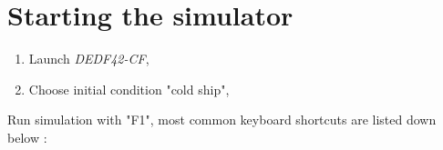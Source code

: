\documentclass[12pt,a4paper]{article}
\begin{document}
%
% 
%    
%
 \section{Starting the simulator}
\begin{enumerate}
 \item Launch \emph{DEDF42-CF},
 \item Choose initial condition "cold ship",
\end{enumerate}

Run simulation with "F1", most common keyboard shortcuts are listed down below : 
 
\end{document}
